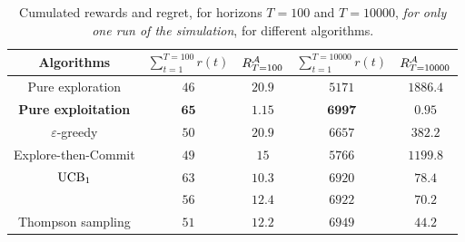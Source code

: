 \begin{table}[!h]
    \begin{small}  %
        \centering
        \begin{tabular}{c|cc|cc}
        \textbf{Algorithms} & $\sum\limits_{t=1}^{T=100} r(t)$ & $R_{T=100}^{\mathcal{A}}$ & $\sum\limits_{t=1}^{T=10000} r(t)$ & $R_{T=10000}^{\mathcal{A}}$ \\
            \hline
            Pure exploration
                & $46$ & $20.9$
                & $5171$ & $1886.4$ \\
            \textbf{Pure exploitation}
                & $\mathbf{65}$ & $\mathbf{1.15}$
                & $\mathbf{6997}$ & $\mathbf{0.95}$ \\
            \hline
            $\varepsilon$-greedy
                & $50$ & $20.9$
                & $6657$ & $382.2$ \\
            Explore-then-Commit
                & $49$ & $15$
                & $5766$ & $1199.8$ \\
            \hline
            $\mathrm{UCB}_1$
                & $63$ & $10.3$
                & $6920$ & $78.4$ \\
            \klUCB{}
                & $56$ & $12.4$
                & $6922$ & $70.2$ \\
            \hline
            Thompson sampling
                & $51$ & $12.2$
                & $6949$ & $44.2$ \\
        \end{tabular}
        \caption{Cumulated rewards and regret, for horizons $T=100$ and $T=10000$, \emph{for only one run of the simulation}, for different algorithms.}
        \label{table:2:oneShotResult}
    \end{small}  %
\end{table}

